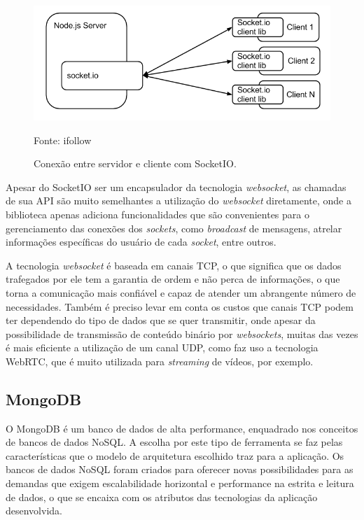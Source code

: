 \begin{figure}[H]
	\centering
	\includegraphics[scale=0.67]{imagens/socketio.png}
	\caption{\small Conexão entre servidor e cliente com SocketIO.} Fonte: ifollow \cite{img-socketio}
	\label{fig:socketio}
\end{figure}

Apesar do SocketIO ser um encapsulador da tecnologia \textit{websocket}, as chamadas de sua API são muito semelhantes a utilização do \textit{websocket} diretamente, onde a biblioteca apenas adiciona funcionalidades que são convenientes para o gerenciamento das conexões dos \textit{sockets}, como \textit{broadcast} de mensagens, atrelar informações específicas do usuário de cada \textit{socket}, entre outros.

A tecnologia \textit{websocket} é baseada em canais TCP, o que significa que os dados trafegados por ele tem a garantia de ordem e não perca de informações, o que torna a comunicação mais confiável e capaz de atender um abrangente número de necessidades. Também é preciso levar em conta os custos que canais TCP podem ter dependendo do tipo de dados que se quer transmitir, onde apesar da possibilidade de transmissão de conteúdo binário por \textit{websockets}, muitas das vezes é mais eficiente a utilização de um canal UDP, como faz uso a tecnologia WebRTC, que é muito utilizada para \textit{streaming} de vídeos, por exemplo.

\subsection{MongoDB}
O MongoDB é um banco de dados de alta performance, enquadrado nos conceitos de bancos de dados NoSQL. A escolha por este tipo de ferramenta se faz pelas características que o modelo de arquitetura escolhido traz para a aplicação. Os bancos de dados NoSQL foram criados para oferecer novas possibilidades para as demandas que exigem escalabilidade horizontal e performance na estrita e leitura de dados, o que se encaixa com os atributos das tecnologias da aplicação desenvolvida.

